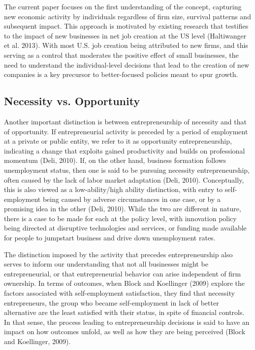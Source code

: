 The current paper focuses on the first understanding of the concept, capturing new economic activity by individuals regardless of firm size, survival patterns and subsequent impact. This approach is motivated by existing research that testifies to the impact of new businesses in net job creation at the US level (Haltiwanger et al. 2013). With most U.S. job creation being attributed to new firms, and this serving as a control that moderates the positive effect of small businesses, the need to understand the individual-level decisions that lead to the creation of new companies is a key precursor to better-focused policies meant to spur growth.

\subsection{Necessity vs. Opportunity}

Another important distinction is between entrepreneurship of necessity and that of opportunity. If entrepreneurial activity is preceded by a period of employment at a private or public entity, we refer to it as opportunity entrepreneurship, indicating a change that exploits gained productivity and builds on professional momentum (Deli, 2010). If, on the other hand, business formation follows unemployment status, then one is said to be pursuing necessity entrepreneurship, often caused by the lack of labor market adaptation (Deli, 2010). Conceptually, this is also viewed as a low-ability/high ability distinction, with entry to self-employment being caused by adverse circumstances in one case, or by a promising idea in the other (Deli, 2010). While the two are different in nature, there is a case to be made for each at the policy level, with innovation policy being directed at disruptive technologies and services, or funding made available for people to jumpstart business and drive down unemployment rates. 

The distinction imposed by the activity that precedes entrepreneurship also serves to inform our understanding that not all businesses might be entrepreneurial, or that entrepreneurial behavior can arise independent of firm ownership. In terms of outcomes, when Block and Koellinger (2009) explore the factors associated with self-employment satisfaction, they find that necessity entrepreneurs, the group who became self-employment in lack of better alternative are the least satisfied with their status, in spite of financial controls. In that sense, the process leading to entrepreneurship decisions is said to have an impact on how outcomes unfold, as well as how they are being perceived  (Block and Koellinger, 2009).

